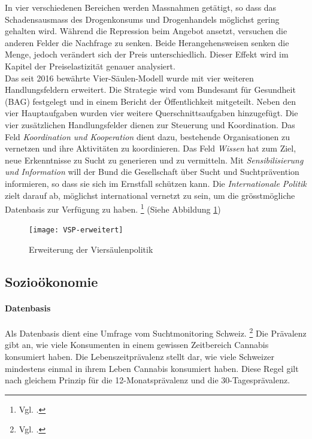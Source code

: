 \documentclass[../main.tex]{subfiles}
\begin{document}
  	\noindent
	In vier verschiedenen Bereichen werden Massnahmen getätigt, so dass das Schadensausmass des Drogenkonsums und Drogenhandels möglichst gering gehalten wird.
	Während die Repression beim Angebot ansetzt, versuchen die anderen Felder die Nachfrage zu senken.
	Beide Herangehensweisen senken die Menge, jedoch verändert sich der Preis unterschiedlich. 
	Dieser Effekt wird im Kapitel der Preiselastizität genauer analysiert.\\
	
	\noindent
	Das seit 2016 bewährte Vier-Säulen-Modell wurde mit vier weiteren Handlungsfeldern erweitert. 
	Die Strategie wird vom Bundesamt für Gesundheit (BAG) festgelegt und in einem Bericht der Öffentlichkeit mitgeteilt.
	Neben den vier Hauptaufgaben wurden vier weitere Querschnittsaufgaben hinzugefügt.
	Die vier zusätzlichen Handlungsfelder dienen zur Steuerung und Koordination.
	Das Feld \textit{Koordination und Kooperation} dient dazu, bestehende Organisationen zu vernetzen und ihre Aktivitäten zu koordinieren.
	Das Feld \textit{Wissen} hat zum Ziel, neue Erkenntnisse zu Sucht zu generieren und zu vermitteln.
	Mit \textit{Sensibilisierung und Information} will der Bund die Gesellschaft über Sucht und Suchtprävention informieren, so dass sie sich im Ernstfall schützen kann.
	Die \textit{Internationale Politik} zielt darauf ab, möglichst international vernetzt zu sein, um die grösstmögliche Datenbasis zur Verfügung zu haben.%
	\footnote{Vgl. \cite{bag-01}.}
	(Siehe Abbildung \ref{fig:vsp})

	\noindent	 
	\begin{figure}[H]
		\centering
		\texttt{[image: VSP-erweitert]}
		\captionsetup{font=small}
		\caption[Erweiterung der Viersäulenpolitik]{Erweiterung der Viersäulenpolitik\protect\footnotemark}		
		\label{fig:vsp}
	\end{figure}
	
	\subsection{Sozioökonomie}
	
	\paragraph{Datenbasis}
	Als Datenbasis dient eine Umfrage vom Suchtmonitoring Schweiz.%
	\footnote{Vgl. \cite{gmel}.}
	Die Prävalenz gibt an, wie viele Konsumenten in einem gewissen Zeitbereich Cannabis konsumiert haben.
	Die Lebenszeitprävalenz stellt dar, wie viele Schweizer mindestens einmal in ihrem Leben Cannabis konsumiert haben.
	Diese Regel gilt nach gleichem Prinzip für die 12-Monatsprävalenz und die 30-Tagesprävalenz.
	
\end{document}
